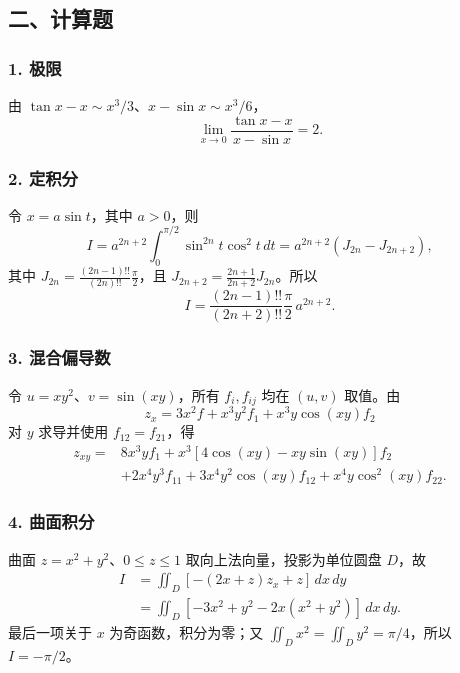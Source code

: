 \documentclass[11pt,fontset=fandol]{ctexart}
\begin{document}
\subsection{二、计算题}\label{ux4e8cux8ba1ux7b97ux9898}

\subsubsection{1. 极限}\label{ux6781ux9650-1}

由 \(\tan x-x\sim x^3/3\)、\(x-\sin x\sim x^3/6\)， \[
\boxed{\lim_{x\to0}\frac{\tan x-x}{x-\sin x}=2.}
\]

\subsubsection{2. 定积分}\label{ux5b9aux79efux5206}

令 \(x=a\sin t\)，其中 \(a>0\)，则 \[
I=a^{2n+2}\int_0^{\pi/2}\sin^{2n}t\cos^2t\,dt=a^{2n+2}(J_{2n}-J_{2n+2}),
\] 其中 \(J_{2n}=\frac{(2n-1)!!}{(2n)!!}\frac\pi2\)，且
\(J_{2n+2}=\frac{2n+1}{2n+2}J_{2n}\)。所以 \[
\boxed{I=\frac{(2n-1)!!}{(2n+2)!!}\frac\pi2\,a^{2n+2}.}
\]

\subsubsection{3. 混合偏导数}\label{ux6df7ux5408ux504fux5bfcux6570}

令 \(u=xy^2\)、\(v=\sin(xy)\)，所有 \(f_i,f_{ij}\) 均在 \((u,v)\)
取值。由 \[
z_x=3x^2f+x^3y^2f_1+x^3y\cos(xy)f_2
\] 对 \(y\) 求导并使用 \(f_{12}=f_{21}\)，得 \[
\boxed{\begin{aligned}
z_{xy}={}&8x^3yf_1+x^3[4\cos(xy)-xy\sin(xy)]f_2\\
&+2x^4y^3f_{11}+3x^4y^2\cos(xy)f_{12}+x^4y\cos^2(xy)f_{22}.
\end{aligned}}
\]

\subsubsection{4. 曲面积分}\label{ux66f2ux9762ux79efux5206}

曲面 \(z=x^2+y^2\)、\(0\leq z\leq1\) 取向上法向量，投影为单位圆盘
\(D\)，故 \[
\begin{aligned}
I&=\iint_D[-(2x+z)z_x+z]\,dx\,dy\\
&=\iint_D[-3x^2+y^2-2x(x^2+y^2)]\,dx\,dy.
\end{aligned}
\] 最后一项关于 \(x\) 为奇函数，积分为零；又
\(\iint_Dx^2=\iint_Dy^2=\pi/4\)，所以 \(\boxed{I=-\pi/2}\)。
\end{document}
